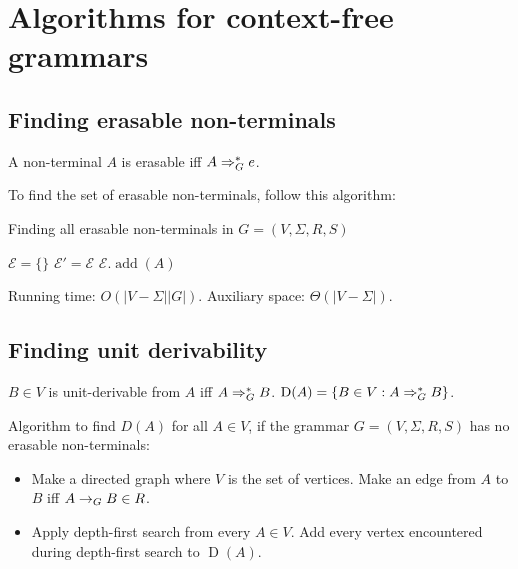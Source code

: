 \section{Algorithms for context-free grammars}

\subsection{Finding erasable non-terminals}

\begin{definition}
A non-terminal $A$ is erasable iff $A \Rightarrow_{G}^* e$.
\end{definition}

To find the set of erasable non-terminals, follow this algorithm:

\begin{algorithm}[H]
\caption{Finding all erasable non-terminals in $G = (V, \Sigma, R, S)$}
\label{algo-erasable-non-terminals}
\begin{algorithmic}
\State $\mathcal{E} = \{\}$
\Do
    \State $\mathcal{E}' = \mathcal{E}$
            \State $\mathcal{E}.\operatorname{add}(A)$
        \EndIf
    \EndFor
{}
\end{algorithmic}
\end{algorithm}

Running time: $O(|V-\Sigma||G|)$.
Auxiliary space: $\Theta(|V-\Sigma|)$.

\subsection{Finding unit derivability}

\begin{definition}
$B \in V$ is unit-derivable from $A$ iff $A \Rightarrow_{G}^* B$.
$\operatorname{D}(A) = \{B \in V: A \Rightarrow_{G}^* B\}$.
\end{definition}

Algorithm to find $D(A)$ for all $A \in V$,
if the grammar $G = (V, \Sigma, R, S)$ has no erasable non-terminals:
\begin{itemize}
\item Make a directed graph where $V$ is the set of vertices.
    Make an edge from $A$ to $B$ iff $A \rightarrow_{G} B \in R$.
\item Apply depth-first search from every $A \in V$.
    Add every vertex encountered during depth-first search to $\operatorname{D}(A)$.
\end{itemize}

